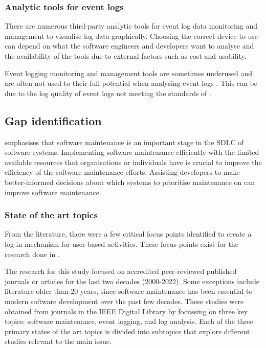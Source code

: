 \subsubsection{Analytic tools for event logs}
There are numerous third-party analytic tools for event log data monitoring and management to visualise log data graphically. Choosing the correct device to use can depend on what the software engineers and developers want to analyse and the availability of the tools due to external factors such as cost and usability. \par Event logging monitoring and management tools are sometimes underused and are often not used to their full potential when analysing event logs \cite{Fedaghi2010}. This can be due to the log quality of event logs not meeting the standards of . 

\newcommand{\studyGap}{Implementing software maintenance efficiently with the limited available resources that organisations or individuals have is crucial to improve the efficiency of the software maintenance efforts. Assisting developers to make better-informed decisions about which systems to prioritise maintenance on can improve software maintenance.}

\subsection{Gap identification}\label{sec:ch1_gapIdentification}
 emphasises that software maintenance is an important stage in the SDLC of software systems. \studyGap

\subsubsection{State of the art topics}
From the literature, there were a few critical focus points identified to create a log-in mechanism for user-based activities. These focus points exist for the research done in .\par The research for this study focused on accredited peer-reviewed published journals or articles for the last two decades (2000-2022). Some exceptions include literature older than 20 years, since software maintenance has been essential to modern software development over the past few decades. These studies were obtained from journals in the IEEE Digital Library by focussing on three key topics: software maintenance, event logging, and log analysis. Each of the three primary states of the art topics is divided into subtopics that explore different studies relevant to the main issue.

